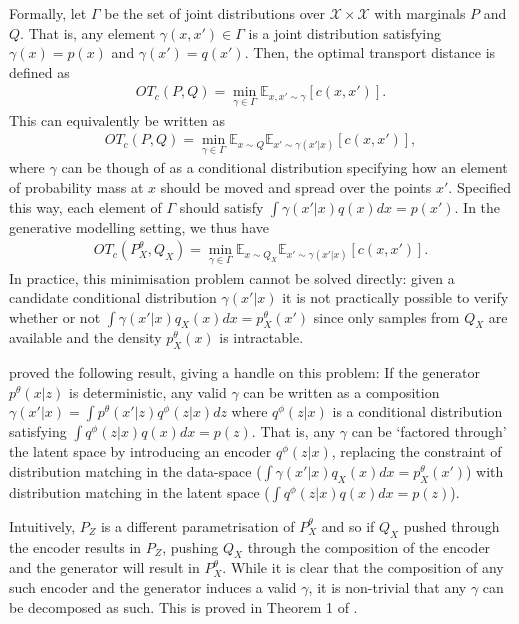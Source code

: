 Formally, let $\Gamma$ be the set of joint distributions over $\mathcal{X} \times \mathcal{X}$ with marginals $P$ and $Q$. 
That is, any element $\gamma(x, x') \in \Gamma$ is a joint distribution satisfying $\gamma(x) = p(x)$ and $\gamma(x') = q(x')$.
Then, the optimal transport distance is defined as
%
\begin{align*}
OT_c(P, Q) = \min_{\gamma \in \Gamma} \mathbb{E}_{x, x' \sim \gamma} \left[ c(x, x') \right].
\end{align*}
%
This can equivalently be written as
%
\begin{align*}
OT_c(P, Q) = \min_{\gamma \in \Gamma} \mathbb{E}_{x\sim Q} \mathbb{E}_{x'\sim \gamma(x'|x)} \left[ c(x, x') \right],
\end{align*}
%
where $\gamma$ can be though of as a conditional distribution specifying how an element of probability mass at $x$ should be moved and spread over the points $x'$. 
Specified this way, each element of $\Gamma$ should satisfy $\int \gamma(x'|x) q(x) dx = p(x')$.
In the generative modelling setting, we thus have
%
\begin{align*}
OT_c(P_X^\theta, Q_X) = \min_{\gamma \in \Gamma} \mathbb{E}_{x\sim Q_X} \mathbb{E}_{x'\sim \gamma(x'|x)} \left[ c(x, x') \right].
\end{align*}
%
In practice, this minimisation problem cannot be solved directly: given a candidate conditional distribution $\gamma(x'|x)$ it is not practically possible to verify whether or not $\int \gamma(x'|x) q_X(x) dx = p_X^\theta(x')$ since only samples from $Q_X$ are available and the density $p^\theta_X(x)$ is intractable.

\cite{tolstikhin2017wasserstein} proved the following result, giving a handle on this problem:
If the generator $p^\theta(x|z)$ is deterministic, any valid $\gamma$ can be written as a composition $\gamma(x'|x) = \int p^\theta(x'|z) q^\phi(z|x) dz$ where $q^\phi(z|x)$ is a conditional distribution satisfying $\int q^\phi(z|x) q(x) dx = p(z)$. 
That is, any $\gamma$ can be `factored through' the latent space by introducing an encoder $q^\phi(z|x)$, replacing the constraint of distribution matching in the data-space ($\int \gamma(x'|x) q_X(x) dx = p_X^\theta(x')$) with distribution matching in the latent space ($\int q^\phi(z|x) q(x) dx = p(z)$).

Intuitively, $P_Z$ is a different parametrisation of $P_X^\theta$ and so if $Q_X$ pushed through the encoder results in $P_Z$, pushing $Q_X$ through the composition of the encoder and the generator will result in $P_X^\theta$. 
While it is clear that the composition of any such encoder and the generator induces a valid $\gamma$, it is non-trivial that any $\gamma$ can be decomposed as such. 
This is proved in Theorem 1 of \cite{tolstikhin2017wasserstein}.

